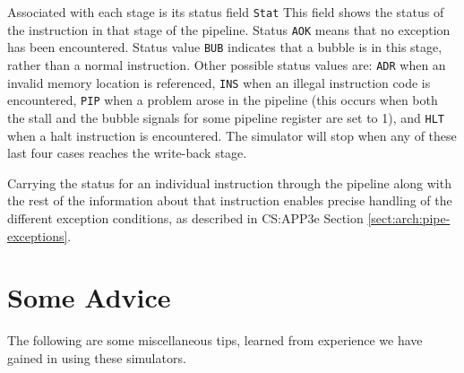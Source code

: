 \documentclass[11pt]{article}
\begin{document}
Associated with each stage is its status field \texttt{Stat}
This field shows the status of the instruction in that
 stage of the pipeline.  Status \texttt{AOK} means that no exception has
 been encountered.  Status value \texttt{BUB} indicates that a bubble is in this
 stage, rather than a normal instruction.  Other possible status
 values are: \texttt{ADR} when an invalid memory location is referenced,
\texttt{INS} when an illegal instruction code is encountered, \texttt{PIP} when
 a problem arose in the pipeline (this occurs when both the stall and
 the bubble signals for some pipeline register are set to 1),
and \texttt{HLT}
 when a halt instruction is encountered.  The simulator will stop
 when any of these last four cases reaches the write-back stage.

Carrying the status for an individual instruction through
 the pipeline along with the rest of the information about that
 instruction enables precise handling of the different exception
 conditions, as described in CS:APP3e Section \ref{sect:arch:pipe-exceptions}.

\section{Some Advice}

The following are some miscellaneous tips, learned from experience we
have gained in using these simulators.
\end{document}
